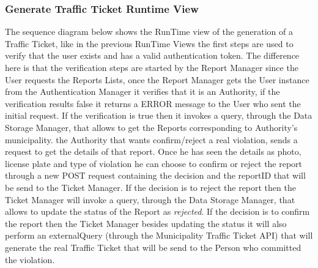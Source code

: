 \subsubsection{Generate Traffic Ticket Runtime View}
The sequence diagram below shows the RunTime view of the generation of a Traffic Ticket, like in the previous RunTime Views the first steps are used to verify that the user exists and has a valid authentication token. The difference here is that the verification steps are started by the Report Manager since the User requests the Reports Lists, once the Report Manager gets the User instance from the Authentication Manager it verifies that it is an Authority, if the verification results false it returns a ERROR message to the User who sent the initial request. If the verification is true then it invokes a query, through the Data Storage Manager, that allows to get the Reports corresponding to Authority's municipality.\newline
the Authority that wants confirm/reject a real violation, sends a request to get the details of that report. Once he has seen the details as photo, license plate and type of violation he can choose to confirm or reject the report through a new POST request containing the decision and the reportID that will be send to the Ticket Manager.\newline
If the decision is to reject the report then the Ticket Manager will invoke a query, through the Data Storage Manager, that allows to update the status of the Report as \textit{rejected}. If the decision is to confirm the report then the Ticket Manager besides updating the status it will also perform an externalQuery (through the Municipality Traffic Ticket API) that will generate the real Traffic Ticket that will be send to the Person who committed the violation.\newline 
